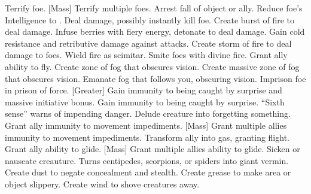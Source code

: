     {Terrify foe.}
[Mass]
    {Terrify multiple foes.}
    {Arrest fall of object or ally.}
    {Reduce foe's Intelligence to .}
    {Deal damage, possibly instantly kill foe.}
    {Create burst of fire to deal damage.}
    {Infuse berries with fiery energy, detonate to deal damage.}
    {Gain cold resistance and retributive damage against attacks.}
    {Create storm of fire to deal damage to foes.}
    {Wield fire as scimitar.}
    {Smite foes with divine fire.}
    {Grant ally ability to fly.}
    {Create zone of fog that obscures vision.}
    {Create massive zone of fog that obscures vision.}
    {Emanate fog that follows you, obscuring vision.}
    {Imprison foe in prison of force.}
[Greater]
    {Gain immunity to being caught by surprise and massive initiative bonus.}
    {Gain immunity to being caught by surprise.}
    {``Sixth sense'' warns of impending danger.}
    {Delude creature into forgetting something.}
    {Grant ally immunity to movement impediments.}
[Mass]
    {Grant multiple allies immunity to movement impediments.}
    {Transform ally into gas, granting flight.}
    {Grant ally ability to glide.}
[Mass]
    {Grant multiple allies ability to glide.}
    {Sicken or nauseate creauture.}
    {Turns centipedes, scorpions, or spiders into giant vermin.}
    {Create dust to negate concealment and stealth.}
    {Create grease to make area or object slippery.}
    {Create wind to shove creatures away.}
